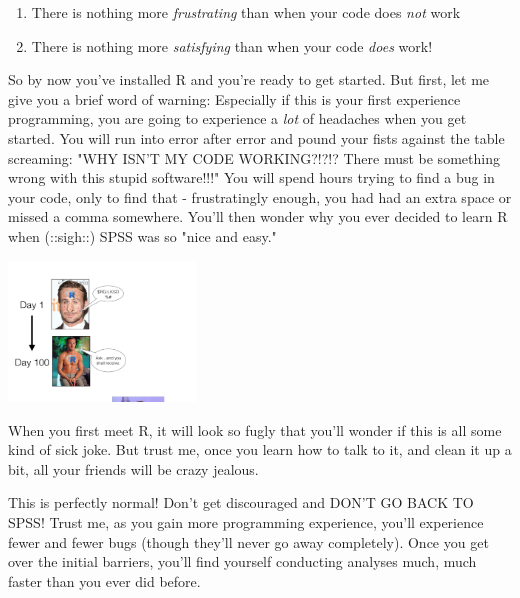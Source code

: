 \documentclass{tufte-book}\usepackage[]{graphicx}\usepackage[]{color}
\begin{document}
\begin{large}
\begin{enumerate}

  \item There is nothing more \textit{frustrating} than when your code does \textit{not} work

  \item There is nothing more \textit{satisfying} than when your code \textit{does} work!

\end{enumerate}
\end{large}


So by now you've installed R and you're ready to get started. But first, let me give you a brief word of warning: Especially if this is your first experience programming, you are going to experience a \textit{lot} of headaches when you get started. You will run into error after error and pound your fists against the table screaming: "WHY ISN'T MY CODE WORKING?!?!? There must be something wrong with this stupid software!!!" You will spend hours trying to find a bug in your code, only to find that - frustratingly enough, you had had an extra space or missed a comma somewhere. You'll then wonder why you ever decided to learn R when (::sigh::) SPSS was so "nice and easy."

\begin{marginfigure}
\includegraphics[width=5cm,keepaspectration]{gosling.pdf}
\caption{When you first meet R, it will look so fugly that you'll wonder if this is all some kind of sick joke. But trust me, once you learn how to talk to it, and clean it up a bit, all your friends will be crazy jealous.}
\end{marginfigure}




This is perfectly normal! Don't get discouraged and DON'T GO BACK TO SPSS! Trust me, as you gain more programming experience, you'll experience fewer and fewer bugs (though they'll never go away completely). Once you get over the initial barriers, you'll find yourself conducting analyses much, much faster than you ever did before.
\end{document}
